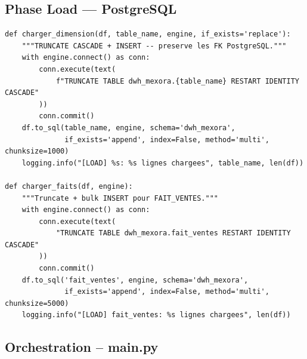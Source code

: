 \documentclass[12pt,a4paper]{article}
\begin{document}
\subsection{Phase Load --- PostgreSQL}

\begin{lstlisting}[style=python, caption=charger\_dimension et charger\_faits (loader.py)]
def charger_dimension(df, table_name, engine, if_exists='replace'):
    """TRUNCATE CASCADE + INSERT -- preserve les FK PostgreSQL."""
    with engine.connect() as conn:
        conn.execute(text(
            f"TRUNCATE TABLE dwh_mexora.{table_name} RESTART IDENTITY CASCADE"
        ))
        conn.commit()
    df.to_sql(table_name, engine, schema='dwh_mexora',
              if_exists='append', index=False, method='multi', chunksize=1000)
    logging.info("[LOAD] %s: %s lignes chargees", table_name, len(df))

def charger_faits(df, engine):
    """Truncate + bulk INSERT pour FAIT_VENTES."""
    with engine.connect() as conn:
        conn.execute(text(
            "TRUNCATE TABLE dwh_mexora.fait_ventes RESTART IDENTITY CASCADE"
        ))
        conn.commit()
    df.to_sql('fait_ventes', engine, schema='dwh_mexora',
              if_exists='append', index=False, method='multi', chunksize=5000)
    logging.info("[LOAD] fait_ventes: %s lignes chargees", len(df))
\end{lstlisting}

\subsection{Orchestration -- main.py}
\end{document}
